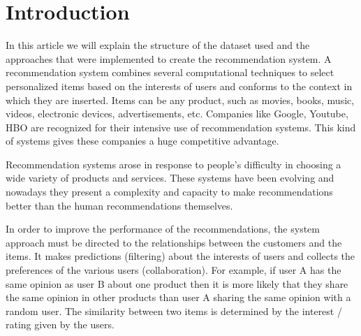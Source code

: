 \section{Introduction}
\label{intro}
In this article we will explain the structure of the dataset used and the approaches that
were implemented to create the recommendation system.
A recommendation system combines several computational techniques to select personalized items based on the
interests of users and conforms to the context in which they are inserted.
Items can be any product, such as movies, books, music, videos, electronic devices, advertisements, etc.
Companies like Google, Youtube, HBO are recognized for their intensive use of recommendation systems.
This kind of systems gives these companies a huge competitive advantage.

Recommendation systems arose in response to people's difficulty in choosing a wide variety of products and services.
These systems have been evolving and nowadays they present a complexity and capacity to make recommendations better
than the human recommendations themselves.

In order to improve the performance of the recommendations, the system approach must be directed to the relationships
between the customers and the items. 
It makes predictions (filtering) about the interests of users and collects the preferences of the various users (collaboration).
For example, if user A has the same opinion as user B about one product then it is more likely that they share
the same opinion in other products than user A sharing the same opinion with a random user.
The similarity between two items is determined by the interest / rating given by the users.